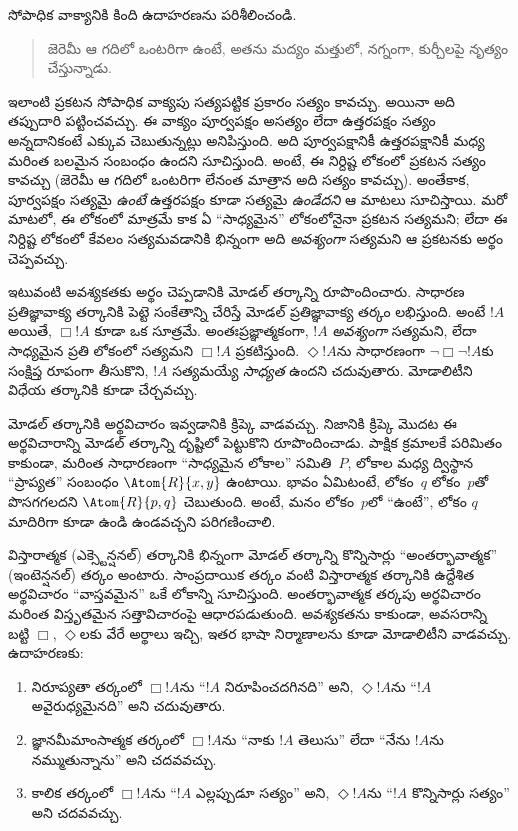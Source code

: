 \documentclass[../../../include/open-logic-section]{subfiles}
\begin{document}


సోపాధిక వాక్యానికి కింది ఉదాహరణను పరిశీలించండి.
\begin{quote}
  జెరెమీ ఆ గదిలో ఒంటరిగా ఉంటే, అతను మద్యం మత్తులో, నగ్నంగా,
  కుర్చీలపై నృత్యం చేస్తున్నాడు.
\end{quote}
ఇలాంటి ప్రకటన సోపాధిక వాక్యపు సత్యపట్టిక ప్రకారం సత్యం కావచ్చు. అయినా అది తప్పుదారి పట్టించవచ్చు.
ఈ వాక్యం పూర్వపక్షం అసత్యం లేదా ఉత్తరపక్షం సత్యం అన్నదానికంటే ఎక్కువ చెబుతున్నట్లు అనిపిస్తుంది.
అది పూర్వపక్షానికీ ఉత్తరపక్షానికీ మధ్య మరింత బలమైన సంబంధం
ఉందని సూచిస్తుంది. అంటే, ఈ నిర్దిష్ట లోకంలో
ప్రకటన సత్యం కావచ్చు (జెరెమీ ఆ గదిలో ఒంటరిగా లేనంత మాత్రాన అది
సత్యం కావచ్చు). అంతేకాక, పూర్వపక్షం సత్యమై \emph{ఉంటే}
ఉత్తరపక్షం కూడా సత్యమై \emph{ఉండేదని} ఆ మాటలు సూచిస్తాయి. మరో
మాటలో, ఈ లోకంలో మాత్రమే కాక ఏ ``సాధ్యమైన'' లోకంలోనైనా ప్రకటన
సత్యమని; లేదా ఈ నిర్దిష్ట లోకంలో కేవలం సత్యమవడానికి భిన్నంగా అది
\emph{అవశ్యంగా} సత్యమని ఆ ప్రకటనకు అర్థం చెప్పవచ్చు.

ఇటువంటి అవశ్యకతకు అర్థం చెప్పడానికి మోడల్ తర్కాన్ని రూపొందించారు.
సాధారణ ప్రతిజ్ఞావాక్య తర్కానికి పెట్టె సంకేతాన్ని చేరిస్తే మోడల్
ప్రతిజ్ఞావాక్య తర్కం లభిస్తుంది. అంటే $!A$  అయితే,
$\Box !A$ కూడా ఒక సూత్రమే. అంతఃప్రజ్ఞాత్మకంగా, $!A$ \emph{అవశ్యంగా}
సత్యమని, లేదా సాధ్యమైన ప్రతి లోకంలో సత్యమని $\Box !A$ ప్రకటిస్తుంది.
$\Diamond !A$ను సాధారణంగా $\lnot \Box \lnot !A$కు సంక్షిప్త రూపంగా
తీసుకొని, $!A$ సత్యమయ్యే \emph{సాధ్యత} ఉందని చదువుతారు.
మోడాలిటీని విధేయ తర్కానికి కూడా చేర్చవచ్చు.

మోడల్ తర్కానికి అర్థవిచారం ఇవ్వడానికి క్రిప్కె 
వాడవచ్చు. నిజానికి క్రిప్కె మొదట ఈ అర్థవిచారాన్ని మోడల్ తర్కాన్ని
దృష్టిలో పెట్టుకొని రూపొందించాడు. పాక్షిక క్రమాలకే పరిమితం కాకుండా,
మరింత సాధారణంగా ``సాధ్యమైన లోకాల'' సమితి~$P$, లోకాల మధ్య
ద్విస్థాన ``ప్రాప్యత'' సంబంధం $\Atom{R}{x,y}$ ఉంటాయి.
భావం ఏమిటంటే, లోకం~$q$ లోకం~$p$తో పొసగగలదని
$\Atom{R}{p,q}$ చెబుతుంది. అంటే, మనం లోకం~$p$లో ``ఉంటే'', లోకం
$q$ మాదిరిగా కూడా ఉండి ఉండవచ్చని పరిగణించాలి.

విస్తారాత్మక (ఎక్స్టెన్షనల్) తర్కానికి భిన్నంగా మోడల్ తర్కాన్ని
కొన్నిసార్లు ``అంతర్భావాత్మక'' (ఇంటెన్షనల్) తర్కం అంటారు.
సాంప్రదాయిక తర్కం వంటి విస్తారాత్మక తర్కానికి ఉద్దేశిత అర్థవిచారం
``వాస్తవమైన'' ఒకే లోకాన్ని సూచిస్తుంది. అంతర్భావాత్మక తర్కపు
అర్థవిచారం మరింత విస్తృతమైన సత్తావిచారంపై ఆధారపడుతుంది. అవశ్యకతను
 కాకుండా, అవసరాన్ని బట్టి $\Box$,
$\Diamond$లకు వేరే అర్థాలు ఇచ్చి, ఇతర భాషా నిర్మాణాలను
 కూడా మోడాలిటీని వాడవచ్చు. ఉదాహరణకు:
\begin{enumerate}
\item నిరూప్యతా తర్కంలో $\Box !A$ను ``$!A$ నిరూపించదగినది'' అని,
  $\Diamond !A$ను ``$!A$ అవైరుధ్యమైనది'' అని చదువుతారు.
\item జ్ఞానమీమాంసాత్మక తర్కంలో $\Box !A$ను ``నాకు $!A$ తెలుసు'' లేదా
  ``నేను $!A$ను నమ్ముతున్నాను'' అని చదవవచ్చు.
\item కాలిక తర్కంలో $\Box !A$ను ``$!A$ ఎల్లప్పుడూ సత్యం'' అని,
  $\Diamond !A$ను ``$!A$ కొన్నిసార్లు సత్యం'' అని చదవవచ్చు.
\end{enumerate}
\end{document}
